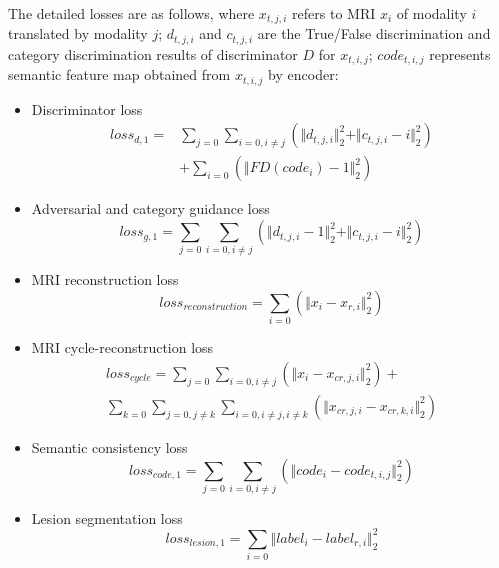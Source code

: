 \documentclass{ecai}
\begin{document}
The detailed losses are as follows, where $x_{t,j,i}$ refers to MRI $x_i$ of modality $i$ translated by modality $j$; $d_{t, j, i}$ and $c_{t, j, i}$ are the True/False discrimination and category discrimination results of discriminator $D$ for $x_{t, i, j}$; $code_{t,i,j}$ represents semantic feature map obtained from $x_{t,i,j}$ by encoder:
\begin{itemize}
	\item{Discriminator loss}
	\begin{equation}
	\begin{split}
		loss_{d,1}=&\sum\limits_{j=0}\sum\limits_{i=0, i\neq j}(\Vert{d_{t,j,i}}\Vert_{2}^{2}+\Vert{c_{t,j,i}-i}\Vert_{2}^{2})\\
		&+\sum\limits_{i=0}(\Vert{FD(code_{i})-1}\Vert_{2}^{2})
	\end{split}
	\end{equation}

	\item{Adversarial and category guidance loss}
	\begin{equation}
		loss_{g,1}=\sum\limits_{j=0}\sum\limits_{i=0, i\neq j}(\Vert{d_{t,j,i}-1}\Vert_{2}^{2}+\Vert{c_{t,j,i}-i}\Vert_{2}^{2})
	\end{equation}
	
	\item{MRI reconstruction loss}
	\begin{equation}
		loss_{reconstruction}=\sum\limits_{i=0}(\Vert{x_i-x_{r,i}}\Vert_{2}^{2})
	\end{equation}
	
	\item{MRI cycle-reconstruction loss}
	\begin{equation}
	\begin{split}
		loss_{cycle}=\sum\limits_{j=0}\sum\limits_{i=0, i\neq j}(\Vert{x_i-x_{cr,j,i}}\Vert_{2}^{2})+\\
		\sum\limits_{k=0}\sum\limits_{j=0,j\neq k}\sum\limits_{i=0, i\neq j,i\neq k}(\Vert{x_{cr,j,i}-x_{cr,k,i}}\Vert_{2}^{2})
	\end{split}
	\end{equation}
	
	\item{Semantic consistency loss}
	\begin{equation}
		loss_{code,1}=\sum\limits_{j=0}\sum\limits_{i=0, i\neq j}(\Vert{code_i-code_{t,i,j}}\Vert_{2}^{2})
	\end{equation}
	
	\item{Lesion segmentation loss}
	\begin{equation}
		loss_{lesion,1}=\sum\limits_{i=0}\Vert{label_i-label_{r,i}}\Vert_{2}^{2}
	\end{equation}
	
\end{itemize}
\end{document}
